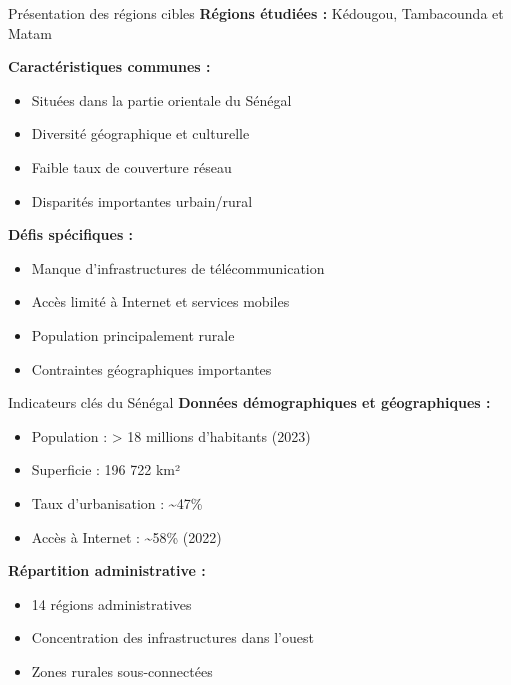 \documentclass[
  ignorenonframetext,
]{beamer}
\providecommand{\tightlist}{%
  \setlength{\itemsep}{0pt}\setlength{\parskip}{0pt}}
\begin{document}
\begin{frame}{Présentation des régions cibles}
\label{pruxe9sentation-des-ruxe9gions-cibles}
\textbf{Régions étudiées :} Kédougou, Tambacounda et Matam

\textbf{Caractéristiques communes :}

\begin{itemize}
\tightlist
\item
  Situées dans la partie orientale du Sénégal
\item
  Diversité géographique et culturelle
\item
  Faible taux de couverture réseau
\item
  Disparités importantes urbain/rural
\end{itemize}

\textbf{Défis spécifiques :}

\begin{itemize}
\tightlist
\item
  Manque d'infrastructures de télécommunication
\item
  Accès limité à Internet et services mobiles
\item
  Population principalement rurale
\item
  Contraintes géographiques importantes
\end{itemize}
\end{frame}

\begin{frame}{Indicateurs clés du Sénégal}
\label{indicateurs-cluxe9s-du-suxe9nuxe9gal}
\textbf{Données démographiques et géographiques :}

\begin{itemize}
\tightlist
\item
  Population : \textgreater{} 18 millions d'habitants (2023)
\item
  Superficie : 196 722 km²
\item
  Taux d'urbanisation : \textasciitilde47\%
\item
  Accès à Internet : \textasciitilde58\% (2022)
\end{itemize}

\textbf{Répartition administrative :}

\begin{itemize}
\tightlist
\item
  14 régions administratives
\item
  Concentration des infrastructures dans l'ouest
\item
  Zones rurales sous-connectées
\end{itemize}
\end{frame}
\end{document}
